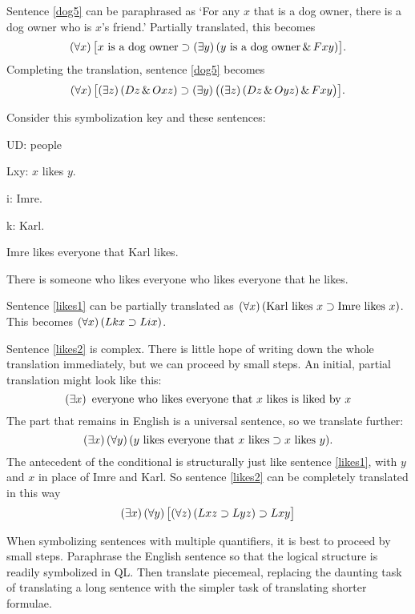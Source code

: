 Sentence \ref{dog5} can be paraphrased as `For any $x$ that is a dog owner, there is a dog owner who is $x$'s friend.' Partially translated, this becomes $$(\forall x) \,\bigl[\mbox{$x$ is a dog owner}\supset(\exists y) \,(\mbox{$y$ is a dog owner}\,\&\, Fxy)\bigr].$$ Completing the translation, sentence \ref{dog5} becomes $$(\forall x) \,\bigl[(\exists z) \,(Dz \,\&\, Oxz)\supset(\exists y) \,\bigl((\exists z) \,(Dz \,\&\, Oyz)\,\&\, Fxy\bigr)\bigr].$$

Consider this symbolization key and these sentences:
\begin{ekey}
\item[UD:] people
\item[Lxy:] $x$ likes $y$.
\item[i:] Imre.
\item[k:] Karl.
\end{ekey}
\begin{earg}
\item[\ex{likes1}]Imre likes everyone that Karl likes.
\item[\ex{likes2}]There is someone who likes everyone who likes everyone that he likes.
\end{earg}

Sentence \ref{likes1} can be partially translated as $(\forall x) \,(\mbox{Karl likes $x$}\supset\mbox{Imre likes $x$})$. This becomes $(\forall x) \,(Lkx\supset Lix)$.


Sentence \ref{likes2} is complex. There is little hope of writing down the whole translation immediately, but we can proceed by small steps. An initial, partial translation might look like this: $$(\exists x) \,\ \mbox{everyone who likes everyone that $x$ likes is liked by $x$}$$
The part that remains in English is a universal sentence, so we translate further: $$(\exists x) \,(\forall y) \,(\mbox{$y$ likes everyone that $x$ likes}\supset\mbox{$x$ likes $y$}).$$
The antecedent of the conditional is structurally just like sentence \ref{likes1}, with $y$ and $x$ in place of Imre and Karl. So sentence \ref{likes2} can be completely translated in this way $$(\exists x) \,(\forall y) \,\bigl[(\forall z) \,(Lxz \supset Lyz) \supset Lxy\bigr]$$

When symbolizing sentences with multiple quantifiers, it is best to proceed by small steps. Paraphrase the English sentence so that the logical structure is readily symbolized in QL. Then translate piecemeal, replacing the daunting task of translating a long sentence with the simpler task of translating shorter formulae.




